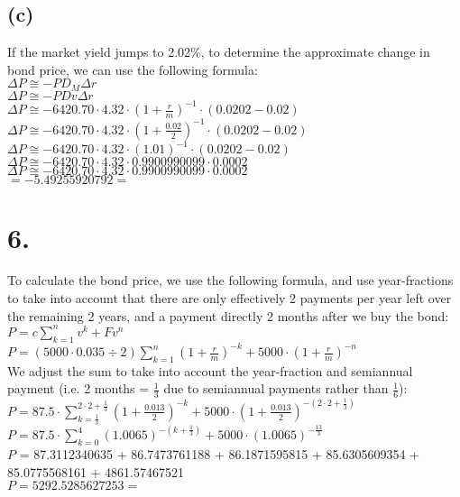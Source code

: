 \documentclass{article}
\begin{document}
{\subsection*{(c)}

If the market yield jumps to 2.02\%, to determine the approximate change in bond price, we can use the following formula: \\
$\Delta P \cong -P D_M \Delta r$ \\
$\Delta P \cong -P Dv \Delta r$ \\
$\Delta P \cong -6420.70 \cdot 4.32 \cdot (1 + \frac{r}{m})^{-1} \cdot (0.0202 - 0.02)$ \\
$\Delta P \cong -6420.70 \cdot 4.32 \cdot (1 + \frac{0.02}{2})^{-1} \cdot (0.0202 - 0.02)$ \\
$\Delta P \cong -6420.70 \cdot 4.32 \cdot (1.01)^{-1} \cdot (0.0202 - 0.02)$ \\
$\Delta P \cong -6420.70 \cdot 4.32 \cdot 0.9900990099 \cdot 0.0002$ \\
$\Delta P \cong -6420.70 \cdot 4.32 \cdot 0.9900990099 \cdot 0.0002$ \\
$= -5.49255920792 = $

}

\section*{6.}
{\Large 

To calculate the bond price, we use the following formula, and use year-fractions to take into account that there are only effectively 2 payments per year left over the remaining 2 years, and a payment directly 2 months after we buy the bond: \\ 
$P = c \sum_{k=1}^{n} v^k + Fv^n$ \\
$P = (5000 \cdot 0.035 \div 2) \sum_{k=1}^{n} (1 + \frac{r}{m})^{-k} + 5000 \cdot (1 + \frac{r}{m})^{-n}$ \\
We adjust the sum to take into account the year-fraction and semiannual payment (i.e. 2 months = $\frac{1}{3}$ due to semiannual payments rather than $\frac{1}{6}$): \\
$P = 87.5 \cdot \sum_{k=\frac{1}{3}}^{2 \cdot 2 + \frac{1}{3}} (1 + \frac{0.013}{2})^{-k} + 5000 \cdot (1 + \frac{0.013}{2})^{-(2 \cdot 2 + \frac{1}{3})}$  \\
$P = 87.5 \cdot \sum_{k=0}^{4} (1.0065)^{-(k + \frac{1}{3})} + 5000 \cdot (1.0065)^{-\frac{13}{3}}$ \\
$P $ = 87.3112340635 + 86.7473761188 + 86.1871595815 + 85.6305609354 + 85.0775568161 + 4861.57467521 \\ 
$P = 5292.5285627253 = $ 


}
\end{document}
